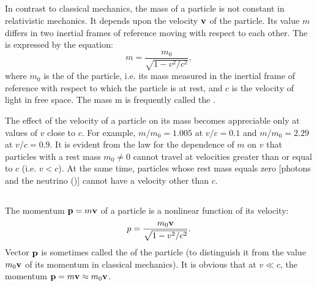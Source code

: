 \subsection{}\label{5.6.1} In contrast to classical mechanics, the mass of a particle is not constant in relativistic mechanics. It depends upon the velocity $\vb{v}$ of the particle. Its value $m$ differs in two inertial frames of reference moving with respect to each other. The  is expressed by the equation:
\begin{equation*}%
m = \frac{m_{0}}{\sqrt{1 - v^{2}/c^{2}}},
\end{equation*}
where $m_{0}$ is the  of the particle, i.e. its mass measured in the inertial frame of reference with respect to which the particle is at rest, and $c$ is the velocity of light in free space. The mass m is frequently called the .

The effect of the velocity of a particle on its mass becomes appreciable only at values of $v$ close to $c$. For example, $m/m_{0} = 1.005$ at $v/c= 0.1$ and $m/m_{0} = 2.29$ at $v/c= 0.9$. It is evident from the law for the dependence of $m$ on $v$ that particles with a rest mass $m_{0} \neq 0$ cannot travel at velocities greater than or equal to $c$ (i.e. $v < c$). At the same time, particles whose rest mass equals zero [photons  and the neutrino ()] cannot have a velocity other than $c$.

\subsection{}\label{5.6.2} The momentum $\vb{p} = m\vb{v}$ of a particle is a nonlinear func­tion of its velocity:
\begin{equation*}%
p = \frac{m_{0}\vb{v}}{\sqrt{1 - v^{2}/c^{2}}}.
\end{equation*}
Vector $\vb{p}$ is sometimes called the  of the particle (to distinguish it from the value $m_{0}\vb{v}$ of its momentum in classical mechanics). It is obvious that at $v \ll c$, the mo­mentum $\vb{p} = m \vb{v} \approx m_{0}\vb{v}$.

